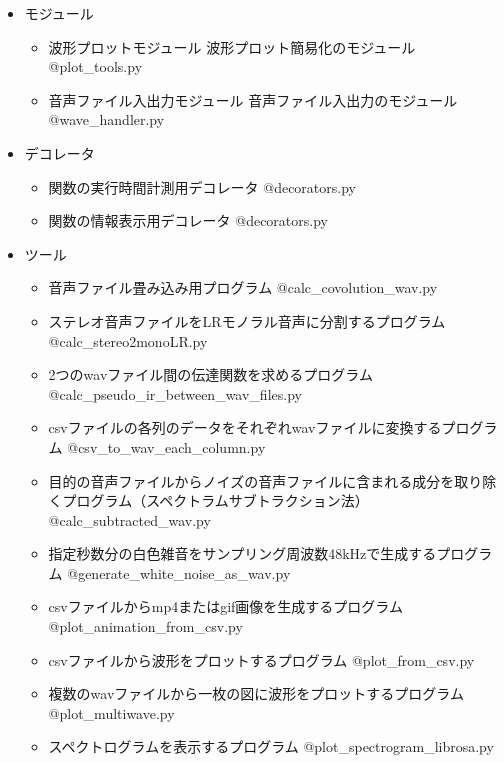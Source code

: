 \begin{itemize}
\tightlist
\item
  モジュール

  \begin{itemize}
  \item
    波形プロットモジュール 波形プロット簡易化のモジュール
    @plot\_tools.py
  \item
    音声ファイル入出力モジュール
    音声ファイル入出力のモジュール @wave\_handler.py
  \end{itemize}
\item
  デコレータ

  \begin{itemize}
  \item
    関数の実行時間計測用デコレータ @decorators.py
  \item
    関数の情報表示用デコレータ @decorators.py
  \end{itemize}
\item
  ツール

  \begin{itemize}
  \item
    音声ファイル畳み込み用プログラム @calc\_covolution\_wav.py
  \item
    ステレオ音声ファイルをLRモノラル音声に分割するプログラム
    @calc\_stereo2monoLR.py
  \item
    2つのwavファイル間の伝達関数を求めるプログラム
    @calc\_pseudo\_ir\_between\_wav\_files.py
  \item
    csvファイルの各列のデータをそれぞれwavファイルに変換するプログラム
    @csv\_to\_wav\_each\_column.py
  \item
    目的の音声ファイルからノイズの音声ファイルに含まれる成分を取り除くプログラム（スペクトラムサブトラクション法）
    @calc\_subtracted\_wav.py
  \item
    指定秒数分の白色雑音をサンプリング周波数48kHzで生成するプログラム
    @generate\_white\_noise\_as\_wav.py
  \item
    csvファイルからmp4またはgif画像を生成するプログラム
    @plot\_animation\_from\_csv.py
  \item
    csvファイルから波形をプロットするプログラム @plot\_from\_csv.py
  \item
    複数のwavファイルから一枚の図に波形をプロットするプログラム
    @plot\_multiwave.py
  \item
    スペクトログラムを表示するプログラム @plot\_spectrogram\_librosa.py
  \end{itemize}
\end{itemize}

